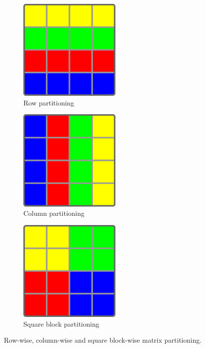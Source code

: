\begin{figure}
	\centering
	\begin{subfigure}{.3\linewidth}
		\centering
		\includegraphics[width=0.55\textwidth]{images/rowPartitioning.png}
		\caption{Row partitioning}
		\label{fig:rowPartitioning}
	\end{subfigure}
	\begin{subfigure}{.3\linewidth}
		\centering
		\includegraphics[width=0.55\textwidth]{images/columnPartitioning.png}
		\caption{Column partitioning}
		\label{fig:columnPartitioning}
	\end{subfigure}
	\begin{subfigure}{.3\linewidth}
		\centering
		\includegraphics[width=0.55\textwidth]{images/quadraticBlockPartitioning.png}
		\caption{Square block partitioning}
		\label{fig:quadraticBlockPartitioning}
	\end{subfigure}
	\caption{Row-wise, column-wise and square block-wise matrix partitioning.}
	\label{fig:Partitionings}
\end{figure}

